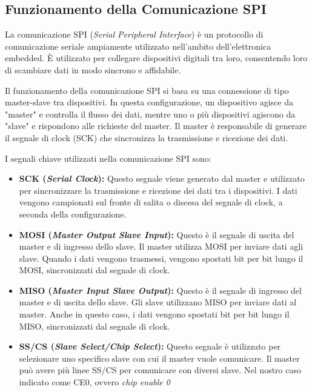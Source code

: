 \documentclass[titlepage]{report}
\begin{document}
		\subsection*{Funzionamento della Comunicazione SPI}
		\label{subsec:funzionamento_spi_comm}
			La comunicazione SPI (\textit{Serial Peripheral Interface}) è un protocollo di comunicazione seriale ampiamente utilizzato nell'ambito dell'elettronica embedded. È utilizzato per collegare dispositivi digitali tra loro, consentendo loro di scambiare dati in modo sincrono e affidabile. 

			Il funzionamento della comunicazione SPI si basa su una connessione di tipo master-slave tra dispositivi. In questa configurazione, un dispositivo agisce da "master" e controlla il flusso dei dati, mentre uno o più dispositivi agiscono da "slave" e rispondono alle richieste del master. Il master è responsabile di generare il segnale di clock (SCK) che sincronizza la trasmissione e ricezione dei dati.

			I segnali chiave utilizzati nella comunicazione SPI sono:
			\begin{itemize}
			\item \textbf{SCK (\textit{Serial Clock}):} Questo segnale viene generato dal master e utilizzato per sincronizzare la trasmissione e ricezione dei dati tra i dispositivi. I dati vengono campionati sul fronte di salita o discesa del segnale di clock, a seconda della configurazione.
			
			\item \textbf{MOSI (\textit{Master Output Slave Input}):} Questo è il segnale di uscita del master e di ingresso dello slave. Il master utilizza MOSI per inviare dati agli slave. Quando i dati vengono trasmessi, vengono spostati bit per bit lungo il MOSI, sincronizzati dal segnale di clock.
			
			\item \textbf{MISO (\textit{Master Input Slave Output}):} Questo è il segnale di ingresso del master e di uscita dello slave. Gli slave utilizzano MISO per inviare dati al master. Anche in questo caso, i dati vengono spostati bit per bit lungo il MISO, sincronizzati dal segnale di clock.
			
			\item \textbf{SS/CS (\textit{Slave Select/Chip Select}):} Questo segnale è utilizzato per selezionare uno specifico slave con cui il master vuole comunicare. Il master può avere più linee SS/CS per comunicare con diversi slave. Nel nostro caso indicato come CE0, ovvero \textit{chip enable 0}
			\end{itemize}
\end{document}
